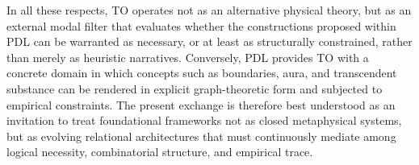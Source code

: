 \documentclass[11pt,a4paper]{article}
\begin{document}
In all these respects, TO operates not as an alternative physical theory, but as an external modal filter that evaluates whether the constructions proposed within PDL can be warranted as necessary, or at least as structurally constrained, rather than merely as heuristic narratives. Conversely, PDL provides TO with a concrete domain in which concepts such as boundaries, aura, and transcendent substance can be rendered in explicit graph-theoretic form and subjected to empirical constraints. The present exchange is therefore best understood as an invitation to treat foundational frameworks not as closed metaphysical systems, but as evolving relational architectures that must continuously mediate among logical necessity, combinatorial structure, and empirical trace.



\end{document}
